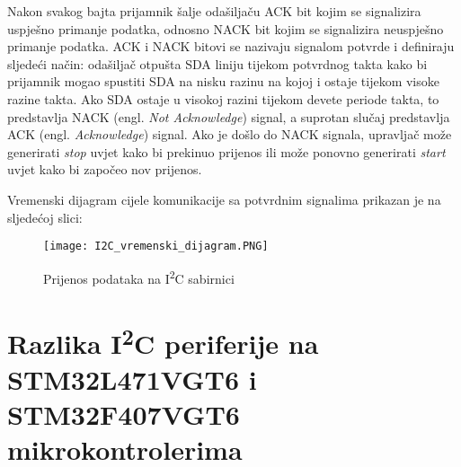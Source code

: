 Nakon svakog bajta prijamnik šalje odašiljaču ACK bit kojim se signalizira uspješno primanje podatka, odnosno NACK bit kojim se signalizira neuspješno primanje podatka. ACK i NACK bitovi se nazivaju signalom potvrde i definiraju sljedeći način: odašiljač otpušta SDA liniju tijekom potvrdnog takta kako bi prijamnik mogao spustiti SDA na nisku razinu na kojoj i ostaje tijekom visoke razine takta. Ako SDA ostaje u visokoj razini tijekom devete periode takta, to predstavlja NACK (engl. \textit{Not Acknowledge}) signal, a suprotan slučaj predstavlja ACK (engl. \textit{Acknowledge}) signal. Ako je došlo do NACK signala, upravljač može generirati \textit{stop} uvjet kako bi prekinuo prijenos ili može ponovno generirati \textit{start} uvjet kako bi započeo nov prijenos.

Vremenski dijagram cijele komunikacije sa potvrdnim signalima prikazan je na sljedećoj slici:
\begin{figure}[hp]
	\centering
	\texttt{[image: I2C\_vremenski\_dijagram.PNG]}
	\caption{Prijenos podataka na I\textsuperscript{2}C sabirnici
	\cite{i2c_manual}}
	\label{fig:i2c_timing_diagram_transaction}
\end{figure}

\section{Razlika I\textsuperscript{2}C periferije na STM32L471VGT6 i \newline STM32F407VGT6 mikrokontrolerima}

